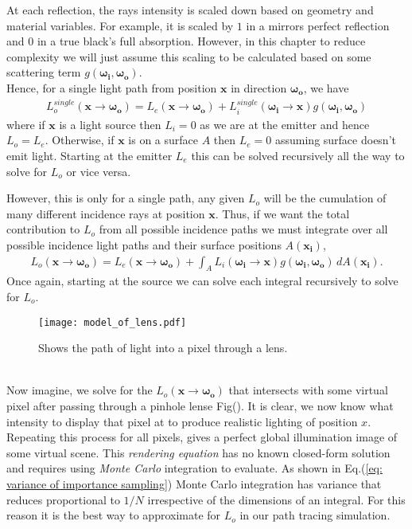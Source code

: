 \documentclass{article}
\begin{document}
At each reflection, the rays intensity is scaled down based on geometry and material variables.
For example, it is scaled by $1$ in a mirrors perfect reflection and $0$ in a true black's full absorption.
However, in this chapter to reduce complexity we will just assume this scaling to be calculated based on some
scattering term $g(\boldsymbol{\omega_i},\boldsymbol{\omega_o})$\label{fn: scattering term}.
\\
Hence, for a single light path from position $\boldsymbol{x}$ in direction $\boldsymbol{\omega_o}$,
we have
\begin{align}
    L_o^{single}(\boldsymbol{x}\rightarrow\boldsymbol{\omega_o}) 
    = L_e(\boldsymbol{x}\rightarrow\boldsymbol{\omega_o}) 
    + L_{i}^{single}(\boldsymbol{\omega_{i}}\rightarrow\boldsymbol{x})
    g(\boldsymbol{\omega_i},\boldsymbol{\omega_o})
\end{align}
where if $\boldsymbol{x}$ is a light source then $L_i=0$ as we are at the emitter and hence $L_o=L_e$.
Otherwise, if $\boldsymbol{x}$ is on a surface $A$ then $L_e=0$ assuming surface doesn't emit light.
Starting at the emitter $L_e$ this can be solved recursively all the way to solve for $L_o$ or vice versa.

However, this is only for a single path, any given $L_o$ will be the cumulation of many different 
incidence rays at position $\boldsymbol{x}$.
Thus, if we want the total contribution to $L_o$ from all possible incidence paths
we must integrate over all possible incidence light paths and their surface positions $A(\boldsymbol{x_i})$,
\begin{align} 
    \label{eq: equation of outgoing intensity}
    L_o(\boldsymbol{x}\rightarrow\boldsymbol{\omega_{o}}) = 
    L_e(\boldsymbol{x}\rightarrow\boldsymbol{\omega_o}) +
    \int_{A} L_{i}(\boldsymbol{\omega_{i}}\rightarrow\boldsymbol{x})
    g(\boldsymbol{\omega_i},\boldsymbol{\omega_o})
    \, dA(\boldsymbol{x_i}).
\end{align}
Once again, starting at the source we can solve each integral recursively to solve for $L_o$.
\\
 \begin{figure}[h]
    \centering
    \texttt{[image: model\_of\_lens.pdf]}
    \caption{Shows the path of light into a pixel through a lens.}
    \label{fig:model of light through a lens}
\end{figure}
\\
Now imagine, we solve for the $L_o(\boldsymbol{x}\rightarrow\boldsymbol{\omega_o})$ that intersects 
with some virtual pixel after passing through a pinhole lense Fig().
It is clear, we now know what intensity to display that pixel at to produce realistic lighting of 
position $x$.
Repeating this process for all pixels, gives a perfect global illumination image of some virtual scene.  
This \textit{rendering equation} has no known closed-form solution and requires using \textit{Monte Carlo}
integration to evaluate. 
As shown in Eq.(\ref{eq: variance of importance sampling}) Monte Carlo integration has variance 
that reduces proportional to $1/N$ irrespective of the dimensions of an integral. 
For this reason it is the best way to approximate for $L_o$ in our path tracing simulation. \cite{KajiyaJamesT.1986Tre} 
\end{document}
